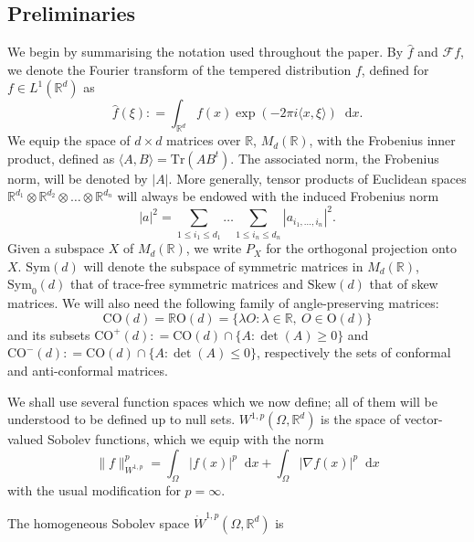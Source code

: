 \documentclass[11pt, a4paper]{amsart}
\theoremstyle{definition}
\theoremstyle{remark}
\newcommand{\R}{\mathbb{R}}
\newcommand*\diff{\mathop{}\!\mathrm{d}}
\begin{document}
\subsection{Preliminaries}
We begin by summarising the notation
used throughout the paper.
By $\widehat f$ and $\mathcal F f$, we
denote the Fourier transform of
the tempered distribution $f$, defined for $f\in L^1(\R^d)$
as
\begin{equation*}
\widehat f(\xi)
\mathrel{:}=
\int_{\R^d} f(x)\exp(-2\pi i \langle x,\xi\rangle)
\diff x.
\end{equation*}
We equip the space of $d\times d$ matrices over
$\mathbb{R}$,
$M_d(\mathbb{R})$, with the Frobenius inner product, 
defined as 
$\langle A,B\rangle=\mathrm{Tr}(AB^t)$.
The associated norm, the Frobenius norm,
will be denoted by $|A|$.
More generally, tensor products of 
Euclidean spaces
$\mathbb{R}^{d_1}\otimes \mathbb{R}^{d_2}
\otimes \dots \otimes\mathbb{R}^{d_n}$
will always be endowed with the induced Frobenius norm 
\begin{equation*}
|a|^2=\sum_{1\le i_1\le d_1}\dots
\sum_{1\le i_n\le d_n}|a_{i_1,\dots, i_n}|^2.
\end{equation*}
Given a subspace $X$ of $M_d(\R)$,
we write $P_X$ for the orthogonal
projection onto $X$. $\mathrm{Sym}(d)$
will denote the subspace of symmetric 
matrices in $M_d(\R)$, $\mathrm{Sym}_0(d)
$ that of trace-free symmetric matrices
and $\mathrm{Skew}(d)$ that of skew 
matrices. We will also need the following family of 
angle-preserving matrices:
\begin{equation*}
\mathrm{CO}(d)=\mathbb R\mathrm{O}(d)
=\{\lambda O:\lambda\in \R,\ O\in \mathrm{O}(d)\}
\end{equation*}
and its subsets $\mathrm{CO}^+(d)\mathrel{:}=
\mathrm{CO}(d)\cap \{A:\det(A)\ge 0\}$
and $\mathrm{CO}^-(d)\mathrel{:}=
\mathrm{CO}(d)\cap \{A:\det(A)\le 0\}$,
respectively the sets
of conformal and anti-conformal matrices.\par
We shall use several function spaces which we now define;
all of them will be understood to be defined
up to null sets.
$W^{1,p}(\Omega, \mathbb{R}^d)$ is 
the space of vector-valued Sobolev functions,
which we equip with the norm
\begin{equation*}
\|f\|_{W^{1,p}}^p=\int_{\Omega}|f(x)|^p\diff x
+\int_{\Omega}|\nabla f(x)|^p\diff x
\end{equation*}
with the usual modification for $p=\infty$.\par
The homogeneous Sobolev space
$\dot{W}^{1,p}(\Omega, \mathbb{R}^d)$ is 
\end{document}
